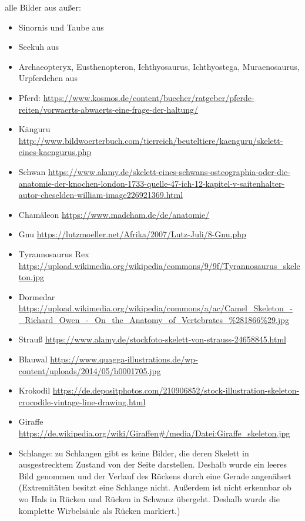  
 alle Bilder aus \cite{Spezielle_Zoologie} außer:
 \begin{itemize}
  \item Sinornis und Taube aus \cite{Vergleichende_Anatomie}
  \item Seekuh aus \cite{Zoologie25Wehner}
  \item Archaeopteryx, Eusthenopteron, Ichthyosaurus, Ichthyostega, Muraenosaurus, Urpferdchen aus \cite{Zoologie24Wehner}
  \item Pferd: \url{https://www.kosmos.de/content/buecher/ratgeber/pferde-reiten/vorwaerts-abwaerts-eine-frage-der-haltung/}
  \item Känguru \url{http://www.bildwoerterbuch.com/tierreich/beuteltiere/kaenguru/skelett-eines-kaengurus.php}
  \item Schwan \url{https://www.alamy.de/skelett-eines-schwans-osteographia-oder-die-anatomie-der-knochen-london-1733-quelle-47-ich-12-kapitel-v-saitenhalter-autor-cheselden-william-image226921369.html}
  \item Chamäleon \url{https://www.madcham.de/de/anatomie/}
  \item Gnu \url{https://lutzmoeller.net/Afrika/2007/Lutz-Juli/8-Gnu.php}
  \item Tyrannosaurus Rex \url{https://upload.wikimedia.org/wikipedia/commons/9/9f/Tyrannosaurus_skeleton.jpg}
  \item Dormedar \url{https://upload.wikimedia.org/wikipedia/commons/a/ac/Camel_Skeleton_-_Richard_Owen_-_On_the_Anatomy_of_Vertebrates_\%281866\%29.jpg}
  \item Strauß \url{https://www.alamy.de/stockfoto-skelett-von-strauss-24658845.html}
  \item Blauwal \url{https://www.quagga-illustrations.de/wp-content/uploads/2014/05/h0001705.jpg}
  \item Krokodil \url{https://de.depositphotos.com/210906852/stock-illustration-skeleton-crocodile-vintage-line-drawing.html}
  \item Giraffe \url{https://de.wikipedia.org/wiki/Giraffen#/media/Datei:Giraffe_skeleton.jpg}
  \item Schlange: zu Schlangen gibt es keine Bilder, die deren Skelett in ausgestrecktem Zustand von der Seite darstellen. Deshalb wurde ein leeres Bild genommen und der Verlauf des Rückens durch eine Gerade angenähert (Extremitäten besitzt eine Schlange nicht. Außerdem ist nicht erkennbar ob \bzw wo Hals in Rücken und Rücken in Schwanz übergeht. Deshalb wurde die komplette Wirbelsäule als Rücken markiert.)
 \end{itemize}

